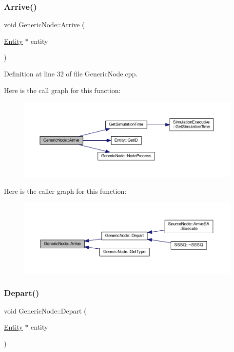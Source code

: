 \subsubsection{\texorpdfstring{Arrive()}{Arrive()}}
{\footnotesize\ttfamily void Generic\+Node\+::\+Arrive (\begin{DoxyParamCaption}\item[{\hyperlink{class_entity}{Entity} $\ast$}]{entity }\end{DoxyParamCaption})}



Definition at line 32 of file Generic\+Node.\+cpp.

Here is the call graph for this function\+:
\nopagebreak
\begin{figure}[H]
\begin{center}
\leavevmode
\includegraphics[width=350pt]{class_generic_node_a923a359d019dc5a97a3da74aa33e2761_cgraph}
\end{center}
\end{figure}
Here is the caller graph for this function\+:
\nopagebreak
\begin{figure}[H]
\begin{center}
\leavevmode
\includegraphics[width=350pt]{class_generic_node_a923a359d019dc5a97a3da74aa33e2761_icgraph}
\end{center}
\end{figure}
\mbox{\label{class_generic_node_a2d573208cd3bc049c7068a331c6cd294}} 
\subsubsection{\texorpdfstring{Depart()}{Depart()}}
{\footnotesize\ttfamily void Generic\+Node\+::\+Depart (\begin{DoxyParamCaption}\item[{\hyperlink{class_entity}{Entity} $\ast$}]{entity }\end{DoxyParamCaption})\hspace{0.3cm}{\ttfamily [protected]}}




